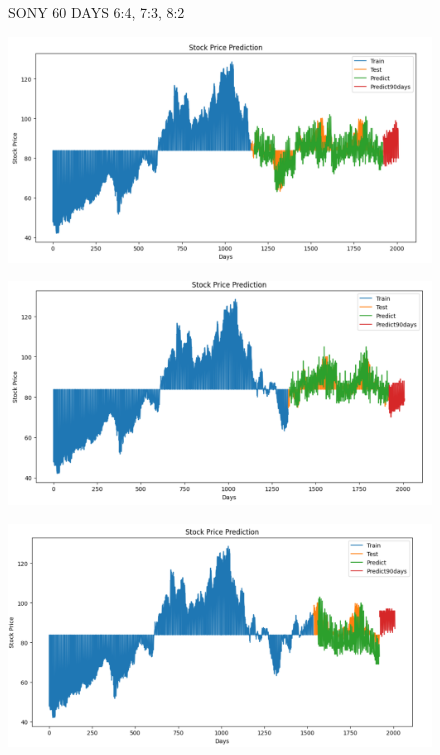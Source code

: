 \documentclass{article}
\begin{document}
\begin{multicols}{2}
\begin{figure}[H]
\begin{minipage}{0.15\textwidth}
    \label{fig:3}
    \end{minipage}
    \caption{SONY 60 DAYS  6:4, 7:3, 8:2 }
\end{figure}

\begin{figure}[H]
    \centering
    \begin{minipage}{0.15\textwidth}
    \centering
    \includegraphics[width=1\textwidth]{Image/N_Beat/N_BEAT_6_4_SONY_90DAYS.png}
   
    \label{fig:1}
    \end{minipage}%
    \begin{minipage}{0.15\textwidth}
    \centering
    \includegraphics[width=1\textwidth]{Image/N_Beat/N_BEAT_7_3_SONY_90DAYS.png}
  
    \label{fig:2}
    \end{minipage}%
    \begin{minipage}{0.15\textwidth}
    \centering
    \includegraphics[width=1\textwidth]{Image/N_Beat/N_BEAT_8_2_SONY_90DAYS.png}


\end{minipage}
\end{figure}
\end{multicols}
\end{document}
